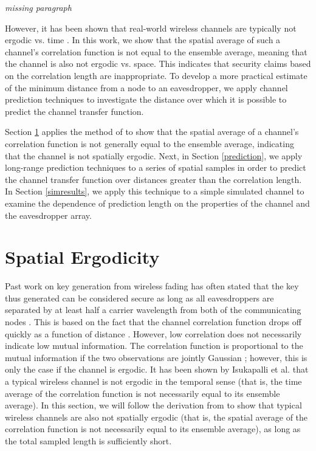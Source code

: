 \documentclass[11pt]{article} %
\begin{document}
\emph{missing paragraph}

However, it has been shown that real-world wireless channels are typically not ergodic vs. time \cite{isukapalli2006}.  In this work, we show that the spatial average of such a channel's correlation function is not equal to the ensemble average, meaning that the channel is also not ergodic vs. space.  This indicates that security claims based on the correlation length are inappropriate.  To develop a more practical estimate of the minimum distance from a node to an eavesdropper, we apply channel prediction techniques \cite{duel-hallen2007} to investigate the distance over which it is possible to predict the channel transfer function.

Section \ref{ergodicity} applies the method of \cite{isukapalli2006} to show that the spatial average of a channel's correlation function is not generally equal to the ensemble average, indicating that the channel is not spatially ergodic. Next, in Section \ref{prediction}, we apply long-range prediction techniques to a series of spatial samples in order to predict the channel transfer function over distances greater than the correlation length.  In Section \ref{simresults}, we apply this technique to a simple simulated channel to examine the dependence of prediction length on the properties of the channel and the eavesdropper array. %


\section{Spatial Ergodicity}\label{ergodicity}
Past work on key generation from wireless fading has often stated that the key thus generated can be considered secure as long as all eavesdroppers are separated by at least half a carrier wavelength from both of the communicating nodes \cite{azimisadjadi2007, bloch2008, mathur2008, ye2010}.  This is based on the fact that the channel correlation function drops off quickly as a function of distance \cite{jakes1974}.  However, low correlation does not necessarily indicate low mutual information.  The correlation function is proportional to the mutual information if the two observations are jointly Gaussian \cite{li1990}; however, this is only the case if the channel is ergodic.  It has been shown by Isukapalli et al. \cite{isukapalli2006} that a typical wireless channel is not ergodic in the temporal sense (that is, the time average of the correlation function is not necessarily equal to its ensemble average).  In this section, we will follow the derivation from \cite{isukapalli2006} to show that typical wireless channels are also not spatially ergodic (that is, the spatial average of the correlation function is not necessarily equal to its ensemble average), as long as the total sampled length is sufficiently short.
\end{document}
